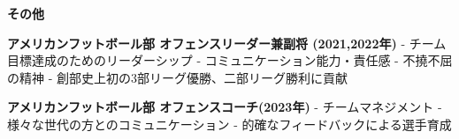 \documentclass[a4paper,10pt]{article}
\begin{document}
\noindent
\begin{minipage}[t]{0.3\textwidth}
    \textbf{その他}
\end{minipage}%
\begin{minipage}[t]{0.7\textwidth}
     \textbf{アメリカンフットボール部 オフェンスリーダー兼副将 (2021,2022年)}\newline
    - チーム目標達成のためのリーダーシップ \newline
    - コミュニケーション能力・責任感 \newline
    - 不撓不屈の精神\newline
    - 創部史上初の3部リーグ優勝、二部リーグ勝利に貢献 \newline

     \textbf{アメリカンフットボール部 オフェンスコーチ(2023年)} \newline
    - チームマネジメント\newline
    - 様々な世代の方とのコミュニケーション\newline
    - 的確なフィードバックによる選手育成\newline
\end{minipage}
\end{document}
